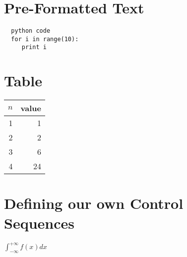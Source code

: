\documentclass[a4paper,12pt]{article}
\begin{document}
  \section{Pre-Formatted Text}
  \begin{verbatim}
  python code  
  for i in range(10):
     print i
  \end{verbatim}

  \section{Table}
  \begin{tabular}{|r|r|}
    \hline
    $n$ & value \\
    \hline
    1   &  1  \\ 
    2   &  2  \\
    3   &  6  \\ 
    4   &  24 \\ 
    \hline
  \end{tabular}

  \section{Defining our own Control Sequences}

  \newcommand{\intmp}[1]{\int_{-\infty}^{+\infty} #1 dx}

  $\intmp{f(x)}$
\end{document}

